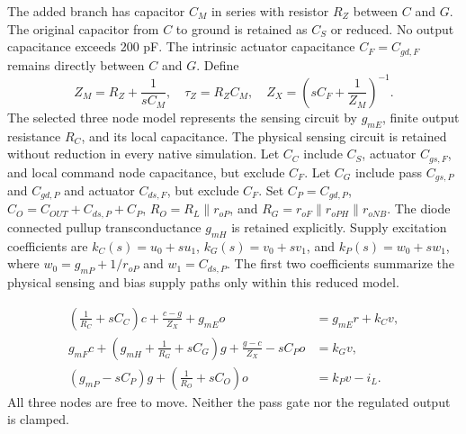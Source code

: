 The added branch has capacitor $C_M$ in series with resistor $R_Z$ between $C$ and $G$. The original capacitor from $C$ to ground is retained as $C_S$ or reduced. No output capacitance exceeds 200 pF. The intrinsic actuator capacitance $C_F=C_{gd,F}$ remains directly between $C$ and $G$. Define
\begin{equation}
 Z_M=R_Z+\frac{1}{sC_M},\quad \tau_Z=R_ZC_M,\quad
 Z_X=\left(sC_F+\frac{1}{Z_M}\right)^{-1}.
\end{equation}
The selected three node model represents the sensing circuit by $g_{mE}$, finite output resistance $R_C$, and its local capacitance. The physical sensing circuit is retained without reduction in every native simulation. Let $C_C$ include $C_S$, actuator $C_{gs,F}$, and local command node capacitance, but exclude $C_F$. Let $C_G$ include pass $C_{gs,P}$ and $C_{gd,P}$ and actuator $C_{ds,F}$, but exclude $C_F$. Set $C_P=C_{gd,P}$, $C_O=C_{OUT}+C_{ds,P}+C_P$, $R_O=R_L\parallel r_{oP}$, and $R_G=r_{oF}\parallel r_{oPH}\parallel r_{oNB}$. The diode connected pullup transconductance $g_{mH}$ is retained explicitly. Supply excitation coefficients are $k_C(s)=u_0+su_1$, $k_G(s)=v_0+sv_1$, and $k_P(s)=w_0+sw_1$, where $w_0=g_{mP}+1/r_{oP}$ and $w_1=C_{ds,P}$. The first two coefficients summarize the physical sensing and bias supply paths only within this reduced model.

\begin{align}
 \left(\frac1{R_C}+sC_C\right)c+\frac{c-g}{Z_X}+g_{mE}o&=g_{mE}r+k_Cv,\\
 g_{mF}c+\left(g_{mH}+\frac1{R_G}+sC_G\right)g+\frac{g-c}{Z_X}-sC_Po&=k_Gv,\\
 (g_{mP}-sC_P)g+\left(\frac1{R_O}+sC_O\right)o&=k_Pv-i_L.
\end{align}
All three nodes are free to move. Neither the pass gate nor the regulated output is clamped.

